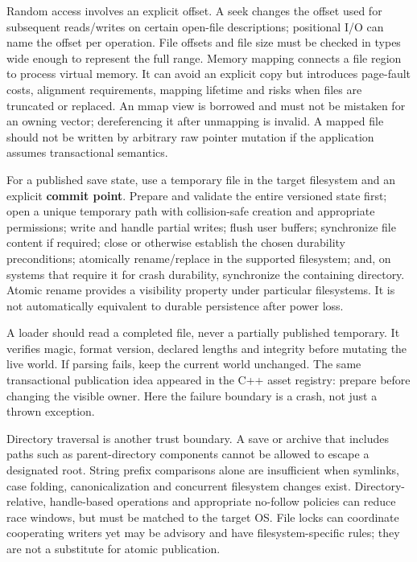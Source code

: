 Random access involves an explicit offset. A seek changes the offset used for subsequent reads/writes on certain open-file descriptions; positional I/O can name the offset per operation. File offsets and file size must be checked in types wide enough to represent the full range. Memory mapping connects a file region to process virtual memory. It can avoid an explicit copy but introduces page-fault costs, alignment requirements, mapping lifetime and risks when files are truncated or replaced. An mmap view is borrowed and must not be mistaken for an owning vector; dereferencing it after unmapping is invalid. A mapped file should not be written by arbitrary raw pointer mutation if the application assumes transactional semantics.

For a published save state, use a temporary file in the target filesystem and an explicit \textbf{commit point}. Prepare and validate the entire versioned state first; open a unique temporary path with collision-safe creation and appropriate permissions; write and handle partial writes; flush user buffers; synchronize file content if required; close or otherwise establish the chosen durability preconditions; atomically rename/replace in the supported filesystem; and, on systems that require it for crash durability, synchronize the containing directory. Atomic rename provides a visibility property under particular filesystems. It is not automatically equivalent to durable persistence after power loss.

A loader should read a completed file, never a partially published temporary. It verifies magic, format version, declared lengths and integrity before mutating the live world. If parsing fails, keep the current world unchanged. The same transactional publication idea appeared in the C++ asset registry: prepare before changing the visible owner. Here the failure boundary is a crash, not just a thrown exception.

Directory traversal is another trust boundary. A save or archive that includes paths such as parent-directory components cannot be allowed to escape a designated root. String prefix comparisons alone are insufficient when symlinks, case folding, canonicalization and concurrent filesystem changes exist. Directory-relative, handle-based operations and appropriate no-follow policies can reduce race windows, but must be matched to the target OS. File locks can coordinate cooperating writers yet may be advisory and have filesystem-specific rules; they are not a substitute for atomic publication.

